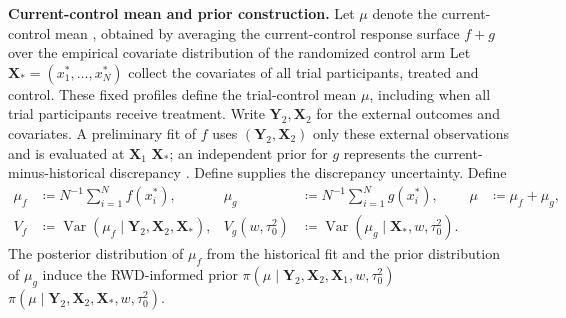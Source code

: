 \documentclass[11pt]{article}
\newcommand{\Var}{\operatorname{Var}}
\theoremstyle{remark}\newtheorem{remark}{Remark}[section]
\providecommand{\DIFaddtex}[1]{{\protect\color{blue} \sf #1}} %
\providecommand{\DIFdeltex}[1]{{\protect\color{red} \scriptsize #1}} %
\providecommand{\DIFaddbegin}{} %
\providecommand{\DIFaddend}{} %
\providecommand{\DIFdelbegin}{} %
\providecommand{\DIFdelend}{} %
\providecommand{\DIFadd}[1]{\texorpdfstring{\DIFaddtex{#1}}{#1}} %
\providecommand{\DIFdel}[1]{\texorpdfstring{\DIFdeltex{#1}}{}} %
\begin{document}
\DIFdelbegin %
\DIFdel{\textbf{Current-control mean and prior construction.}
Let $\mu$ denote the current-control mean , obtained by averaging the current-control response surface $f+g$ over the empirical covariate distribution of the randomized control arm}\DIFdelend \DIFaddbegin \DIFadd{Let $\mathbf X_*=(x_1^*,\ldots,x_N^*)$ collect the covariates of all trial participants, treated and control. These fixed profiles define the trial-control mean $\mu$, including when all trial participants receive treatment. Write $\mathbf Y_2,\mathbf X_2$ for the external outcomes and covariates}\DIFaddend . A preliminary fit of $f$ uses \DIFdelbegin \DIFdel{$(\mathbf Y_{2},\mathbf X_{2})$ }\DIFdelend \DIFaddbegin \DIFadd{only these external observations }\DIFaddend and is evaluated at \DIFdelbegin \DIFdel{$\mathbf X_{1}$}\DIFdelend \DIFaddbegin \DIFadd{$\mathbf X_*$}\DIFaddend ; an independent prior for $g$ \DIFdelbegin \DIFdel{represents the current-minus-historical discrepancy . Define
}%
\DIFdelend \DIFaddbegin \DIFadd{supplies the discrepancy uncertainty. Define
}\begin{equation}\label{eq:varianceparts}
\begin{aligned}
\mu_f&\coloneqq N^{-1}\sum_{i=1}^{N}f(x_i^*),&
\mu_g&\coloneqq N^{-1}\sum_{i=1}^{N}g(x_i^*),&
\mu&\coloneqq\mu_f+\mu_g,\\
V_f&\coloneqq \Var(\mu_f\mid\mathbf Y_{2},\mathbf X_{2},\mathbf X_*),&
V_g(w,\tau_0^2)&\coloneqq\Var(\mu_g\mid\mathbf X_*,w,\tau_0^2).
\end{aligned}
\end{equation}\DIFaddend 
The posterior distribution of $\mu_f$ from the historical fit and the prior distribution of $\mu_g$ induce the RWD-informed prior
\DIFdelbegin \DIFdel{$\pi(\mu\mid\mathbf Y_{2},\mathbf X_{2},\mathbf X_{1},w,\tau_0^2)$}\DIFdelend \DIFaddbegin \DIFadd{$\pi(\mu\mid\mathbf Y_{2},\mathbf X_{2},\mathbf X_*,w,\tau_0^2)$}\DIFaddend .
\end{document}
